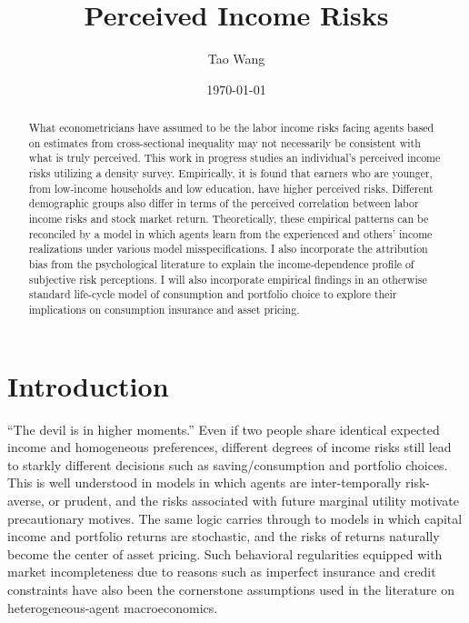 \documentclass[12pt,notitlepage,onecolumn,aps,pra]{article}
\begin{document}
    
    \title{Perceived Income Risks}\author{Tao Wang}

\date{\today}
\maketitle\begin{abstract}What econometricians have assumed to be the labor income risks facing agents based on estimates from cross-sectional inequality may not necessarily be consistent with what is truly perceived. This work in progress studies an individual's perceived income risks utilizing a density survey. Empirically, it is found that earners who are younger, from low-income households and low education, have higher perceived risks. Different demographic groups also differ in terms of the perceived correlation between labor income risks and stock market return. Theoretically, these empirical patterns can be reconciled by a model in which agents learn from the experienced and others' income realizations under various model misspecifications. I also incorporate the attribution bias from the psychological literature to explain the income-dependence profile of subjective risk perceptions.  I will also incorporate empirical findings in an otherwise standard life-cycle model of consumption and portfolio choice to explore their implications on consumption insurance and asset pricing. \end{abstract}


    
    

    
    \hypertarget{introduction}{%
\section{Introduction}\label{introduction}}

``The devil is in higher moments.'' Even if two people share identical
expected income and homogeneous preferences, different degrees of income
risks still lead to starkly different decisions such as
saving/consumption and portfolio choices. This is well understood in
models in which agents are inter-temporally risk-averse, or prudent, and
the risks associated with future marginal utility motivate precautionary
motives. The same logic carries through to models in which capital
income and portfolio returns are stochastic, and the risks of returns
naturally become the center of asset pricing. Such behavioral
regularities equipped with market incompleteness due to reasons such as
imperfect insurance and credit constraints have also been the
cornerstone assumptions used in the literature on heterogeneous-agent
macroeconomics.
\end{document}
